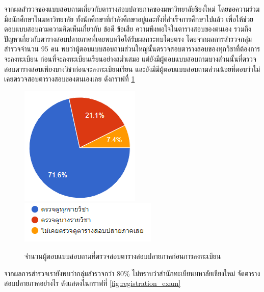 จากผลสำรวจของแบบสอบถามเกี่ยวกับตารางสอบปลายภาคของมหาวิทยาลัยชียงใหม่ โดยขอความร่วมมือนักศึกษาในมหาวิทยาลัย
ทั้งนักศึกษาที่กำลังศึกษาอยู่และทั้งที่สำเร็จการศึกษาไปแล้ว เพื่อให้ช่วยตอบแบบสอบถามความคิดเห็นเกี่ยวกับ ข้อดี ข้อเสีย ความพึงพอใจในตารางสอบของตนเอง
รวมถึงปัญหาเกี่ยวกับตารางสอบปลายภาคที่เคยพบหรือได้รับผลกระทบโดยตรง โดยจากผลการสำรวจกลุ่มสำรวจจำนวน 95 คน พบว่าผู้ตอบแบบสอบถามส่วนใหญ่นั้นตรวจสอบตารางสอบของทุกวิชาที่ต้องการจะลงทะเบียน
ก่อนที่จะลงทะเบียนเรียนอย่างสม่ำเสมอ แต่ยังมีผู้ตอบแบบสอบถามบางส่วนนั้นที่ตรวจสอบตารางสอบเพียงบางวิชาก่อนจะลงทะเบียนเรียน และยังมีมีผู้ตอบแบบสอบถามส่วนน้อยที่ตอบว่าไม่เคยตรวจสอบตารางสอบของตนเองเลย ดังกราฟที่ \ref{fig:check_before_enrollment}
\begin{figure}
  \begin{center}
    \includegraphics{images/checking_schedule_before_enrollment.png}\\[2ex]
    \includegraphics{images/legend_for_checking_schedule_before_enrollment.png}
  \end{center}
  \caption[Poem]{จำนวนผู้ตอบแบบสอบถามที่ตรวจสอบตารางสอบปลายภาคก่อนการลงทะเบียน}
  \label{fig:check_before_enrollment}     
\end{figure}
จากผลการสำรวจเรายังพบว่ากลุ่มสำรวจกว่า 80\% ไม่ทราบว่าสำนักทะเบียนมหาลัยเชียงใหม่ จัดตารางสอบปลายภาคอย่างไร ดังแสดงในกราฟที่ \ref{fig:registration_exam}
